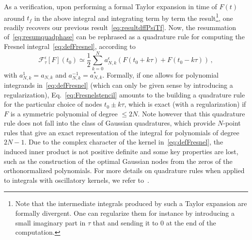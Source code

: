 \documentclass[aps,showpacs,%
prd,superscriptaddress,nofootinbib]{revtex4}
\newcommand{\be}{\begin{equation}}
\newcommand{\ee}{\end{equation}}
\newcommand\ud{{\mathrm{d}}}
\newcommand\calF{{\mathcal{F}}}
\newcommand{\tf}{t_{f}}
\begin{document}
As a verification, upon performing a formal Taylor expansion in time of $F(t)$ around $\tf$ in the above integral and integrating term by term the result\footnote{Note that the intermediate integrals produced by such a Taylor expansion are formally divergent. One can regularize them for instance by introducing a small imaginary part in $\tau$ that and sending it to $0$ at the end of the computation.}, one readily recovers our previous result~\eqref{eq:resultdffPsiTf}. Now, the resummation of~\eqref{eq:resumquadphase} can be rephrased as a quadrature rule for computing the Fresnel integral~\eqref{eq:defFresnel}, according to
\be\label{eq:Fresnelstencil}
	\calF_{\tau}^{\epsilon} [F](t_{0}) \simeq \frac{1}{2} \sum\limits_{k=0}^{N} a_{N,k}^{\epsilon} \left( F(t_{0} + k\tau) + F(t_{0} - k\tau) \right)\,,
\ee
with $a_{N,k}^{1} = a_{N,k}$ and $a_{N,k}^{-1} = a_{N,k}^{*}$. Formally, if one allows for polynomial integrands in~\eqref{eq:defFresnel} (which can only be given sense by introducing a regularization), Eq.~\eqref{eq:Fresnelstencil} amounts to the building a quadrature rule for the particular choice of nodes $t_{0} \pm k \tau$, which is exact (with a regularization) if $F$ is a symmetric polynomial of degree $\leq 2N$. Note however that this quadrature rule does not fall into the class of Gaussian quadratures, which provide $N$-point rules that give an exact representation of the integral for polynomials of degree $2N-1$. Due to the complex character of the kernel in~\eqref{eq:defFresnel}, the induced inner product is not positive definite and some key properties are lost, such as the construction of the optimal Gaussian nodes from the zeros of the orthonormalized polynomials. For more details on quadrature rules when applied to integrals with oscillatory kernels, we refer to~\cite{}.

\end{document}
